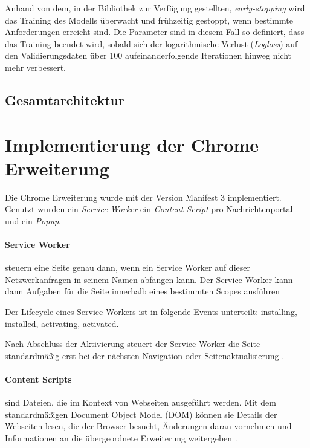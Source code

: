 Anhand von dem, in der Bibliothek zur Verfügung gestellten, \textit{early-stopping} wird das Training des Modells überwacht und frühzeitig gestoppt, wenn bestimmte 
Anforderungen erreicht sind. 
Die Parameter sind in diesem Fall so definiert, dass das Training beendet wird, sobald sich der logarithmische Verlust (\textit{Logloss}) auf den 
Validierungsdaten über 100 aufeinanderfolgende Iterationen hinweg nicht mehr verbessert. %

\subsection{Gesamtarchitektur}



\section{Implementierung der Chrome Erweiterung}

Die Chrome Erweiterung wurde mit der Version Manifest 3 implementiert.
Genutzt wurden ein \textit{Service Worker} ein \textit{Content Script} pro Nachrichtenportal und ein \textit{Popup}.

\paragraph{Service Worker} steuern eine Seite genau dann, wenn ein Service Worker auf dieser Netzwerkanfragen in seinem Namen abfangen kann. 
Der Service Worker kann dann Aufgaben für die Seite innerhalb eines bestimmten Scopes ausführen

Der Lifecycle eines Service Workers ist in folgende Events unterteilt: installing, installed, activating, activated.

Nach Abschluss der Aktivierung steuert der Service Worker die Seite standardmäßig erst 
bei der nächsten Navigation oder Seitenaktualisierung \cite{chrome2025serviceworker}.

\paragraph{Content Scripts} sind Dateien, die im Kontext von Webseiten ausgeführt werden. 
Mit dem standardmäßigen Document Object Model (DOM) können sie Details der Webseiten lesen, die der Browser besucht, 
Änderungen daran vornehmen und Informationen an die übergeordnete Erweiterung weitergeben \cite{chrome2025contentscripts}.

